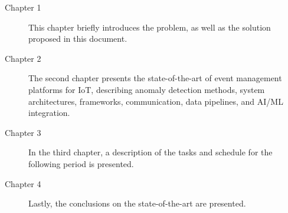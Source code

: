 \begin{description}
	\item[Chapter 1 ] This chapter briefly introduces the problem, as well as the
	      solution proposed in this document.
	\item[Chapter 2 ] The second chapter presents the state-of-the-art of event
	      management platforms for IoT, describing anomaly detection methods, system architectures, frameworks,
	      communication, data pipelines, and \gls{AI}/\gls{ML} integration.
	\item[Chapter 3 ] In the third chapter, a description of the tasks and
	      schedule for the following period is presented.
	\item[Chapter 4 ] Lastly, the conclusions on the state-of-the-art are presented.
\end{description}
